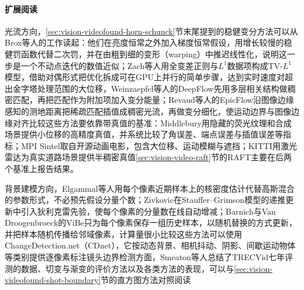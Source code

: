 \paragraph{扩展阅读}
光流方向，\ref{sec:vision-videofound-horn-schunck}节末尾提到的稳健变分方法可以从Brox等人的工作读起：他们在亮度恒常之外加入梯度恒常假设，用增长较慢的稳健罚函数代替二次罚，并在由粗到细的变形（warping）中推迟线性化，说明这一步是一个不动点迭代的数值近似；Zach等人用全变差正则与$L^1$数据项构成TV-$L^1$模型，借助对偶形式把优化拆成可在GPU上并行的简单步骤，达到实时速度对超出金字塔处理范围的大位移，Weinzaepfel等人的DeepFlow先用多层相关结构做稠密匹配，再把匹配作为附加项加入变分能量；Revaud等人的EpicFlow沿图像边缘感知的测地距离把稀疏匹配插值成稠密光流，再做变分细化，使运动边界与图像边缘对齐比较这些方法要依靠带真值的基准：Middlebury用隐藏的荧光纹理和合成场景提供小位移的高精度真值，并系统比较了角误差、端点误差与插值误差等指标；MPI Sintel取自开源动画电影，包含大位移、运动模糊与遮挡；KITTI用激光雷达为真实道路场景提供半稠密真值\ref{sec:vision-video-raft}节的RAFT主要在后两个基准上报告结果。

背景建模方向，Elgammal等人用每个像素近期样本上的核密度估计代替高斯混合的参数形式，不必预先假设分量个数；Zivkovic在Stauffer–Grimson模型的递推更新中引入狄利克雷先验，使每个像素的分量数在线自动增减；Barnich与Van Droogenbroeck的ViBe只为每个像素保存一组历史样本，以随机替换的方式更新，并把样本随机传播给邻域像素，计算量很小比较这些方法可以使用ChangeDetection.net（CDnet），它按动态背景、相机抖动、阴影、间歇运动物体等类别提供逐像素标注镜头边界检测方面，Smeaton等人总结了TRECVid七年评测的数据、切变与渐变的评价方法以及各类方法的表现，可以与\ref{sec:vision-videofound-shot-boundary}节的直方图方法对照阅读

